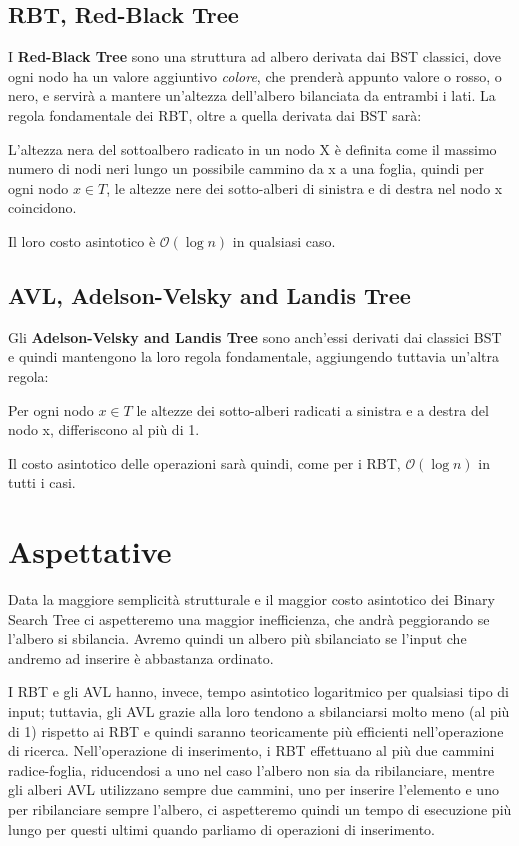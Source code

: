 \documentclass[a4paper,titlepage]{article}
\begin{document}
\subsection{RBT, Red-Black Tree}
I \textbf{Red-Black Tree} sono una struttura ad albero derivata dai BST classici, dove ogni nodo ha un valore aggiuntivo \textit{colore}, che prenderà appunto valore o rosso, o nero, e servirà a mantere un’altezza dell’albero bilanciata da entrambi i lati.
La regola fondamentale dei RBT, oltre a quella derivata dai BST sarà:

\begin{displayquote}
L'altezza nera del sottoalbero radicato in un nodo X è definita come il massimo numero di nodi neri lungo un possibile cammino da x a una foglia, quindi per ogni nodo \(x \in T\), le altezze nere dei sotto-alberi di sinistra e di destra nel nodo x coincidono.
\end{displayquote}

Il loro costo asintotico è  \(\mathcal{O}(\log{}n)\) in qualsiasi caso.

\subsection{AVL, Adelson-Velsky and Landis Tree}

Gli \textbf{Adelson-Velsky and Landis Tree} sono anch’essi derivati dai classici BST e quindi mantengono la loro regola fondamentale, aggiungendo tuttavia un’altra regola:

\begin{displayquote}
Per ogni nodo  \(x \in T\) le altezze dei sotto-alberi radicati a sinistra e a destra del nodo x, differiscono al più di 1.
\end{displayquote}

Il costo asintotico delle operazioni sarà quindi, come per i RBT, \(\mathcal{O}(\log{}n)\) in tutti i casi. 
\newpage

\section{Aspettative}
Data la maggiore semplicità strutturale e il maggior costo asintotico dei Binary Search Tree ci aspetteremo una maggior inefficienza, che andrà peggiorando se l’albero si sbilancia.
Avremo quindi un albero più sbilanciato se l’input che andremo ad inserire è abbastanza ordinato.


I RBT e gli AVL hanno, invece, tempo asintotico logaritmico per qualsiasi tipo di input; tuttavia, gli AVL grazie alla loro  tendono a sbilanciarsi molto meno (al più di 1) rispetto ai RBT e quindi saranno teoricamente più efficienti nell’operazione di ricerca.
Nell’operazione di inserimento, i RBT effettuano al più due cammini radice-foglia, riducendosi a uno nel caso l’albero non sia da ribilanciare, mentre gli alberi AVL utilizzano sempre due cammini, uno per inserire l’elemento e uno per ribilanciare sempre l’albero, ci aspetteremo quindi un tempo di esecuzione più lungo per questi ultimi quando parliamo di operazioni di inserimento. 
\end{document}
